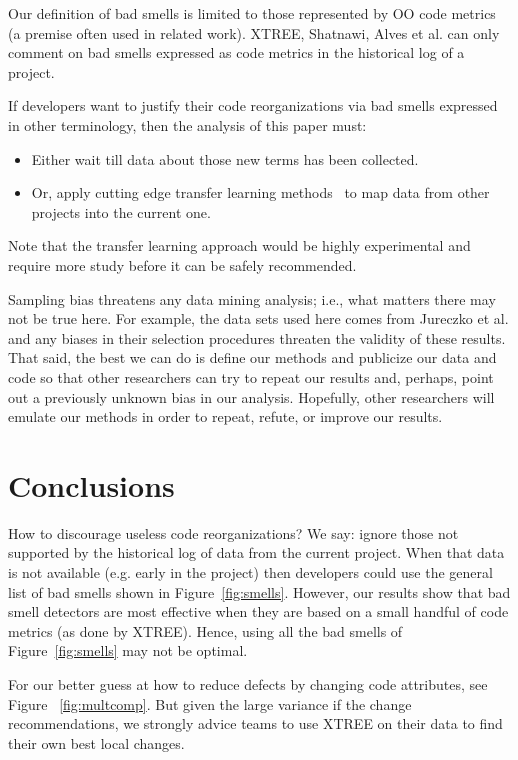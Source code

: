 \documentclass[twocolumn,5p]{elsarticle}
\newcommand{\fig}[1]{Figure~\ref{fig:#1}}
\theoremstyle{break}
\begin{document}
\begin{itemize}
Our definition of bad smells is limited to those represented by OO code metrics (a premise often used in related work).   
XTREE, Shatnawi, Alves et al. can  only comment
on bad smells   expressed as code metrics 
in the historical log of a project. 

If developers want to justify their code reorganizations
via bad smells expressed in other terminology,
then the  analysis of this paper must:
\begin{itemize}
	\item Either wait till 
	data about those new
	terms has been collected. 
	\item Or, apply cutting edge transfer learning
	methods~\cite{Nam15,Jing15, krishna16} to map data from other projects
	into the current one.
	\end{itemize}
	Note that the transfer learning approach would
	be highly experimental and require more study
	before it can be safely recommended.
	
	Sampling bias threatens any data mining analysis; i.e., what matters
	there may not be true here. For example, the data sets used here comes from Jureczko et al. and any biases in their selection procedures
	threaten the validity of these results. 
	That said,
	the best we can do is define our methods and publicize our data and code so that other researchers can
	try to repeat our results and, perhaps, point out a previously unknown bias
	in our analysis. Hopefully, other researchers will emulate our methods in
	order to repeat, refute, or improve our results. 

		
		\section{Conclusions}
		How to discourage useless code reorganizations?
		We say: ignore those not supported by the historical log of data from
		the current project.  
		When that data is not available (e.g. early
		in the project) then developers could use the general list of
		bad smells shown in \fig{smells}. However, 
		our results
		show that  bad smell detectors are most
		effective when they are based
		on a small handful of code metrics (as done by XTREE).
		Hence, using all the bad smells of \fig{smells} may not be optimal. 
		
		For our better guess at how to reduce defects by changing code attributes,
		see  Figure ~\ref{fig:multcomp}. But given the large variance if the change recommendations, we strongly advice teams to use
		XTREE on their data to find their own best local changes.
		

\end{itemize}
\end{document}
